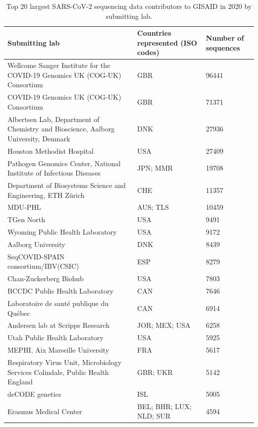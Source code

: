 \documentclass[9pt,twoside,lineno]{pnas-new}
\begin{document}
\begin{table}[h!]
\caption{Top 20 largest SARS-CoV-2 sequencing data contributors to GISAID in 2020 by submitting lab.}
\label{tab:seq-contributions}
\begin{tabular}{lll}
\hline
Submitting lab & Countries represented (ISO codes) & Number of sequences \\
\hline
Wellcome Sanger Institute for the COVID-19 Genomics UK (COG-UK) Consortium & GBR & 96441 \\ 
COVID-19 Genomics UK (COG-UK) Consortium & GBR & 71371 \\ 
Albertsen Lab, Department of Chemistry and Bioscience, Aalborg University, Denmark & DNK & 27936 \\ 
Houston Methodist Hospital & USA & 27409 \\ 
Pathogen Genomics Center, National Institute of Infectious Diseases & JPN; MMR & 19708 \\ 
Department of Biosystems Science and Engineering, ETH Zürich & CHE & 11357 \\ 
MDU-PHL & AUS; TLS & 10459 \\ 
TGen North & USA & 9491 \\ 
Wyoming Public Health Laboratory & USA & 9172 \\ 
Aalborg University & DNK & 8439 \\ 
SeqCOVID-SPAIN consortium/IBV(CSIC) & ESP & 8279 \\ 
Chan-Zuckerberg Biohub & USA & 7803 \\ 
BCCDC Public Health Laboratory & CAN & 7646 \\ 
Laboratoire de santé publique du Québec & CAN & 6914 \\ 
Andersen lab at Scripps Research & JOR; MEX; USA & 6258 \\ 
Utah Public Health Laboratory & USA & 5925 \\ 
MEPHI, Aix Marseille University & FRA & 5617 \\ 
Respiratory Virus Unit, Microbiology Services Colindale, Public Health England & GBR; UKR & 5142 \\ 
deCODE genetics & ISL & 5005 \\ 
Erasmus Medical Center & BEL; BHR; LUX; NLD; SUR & 4594 \\
\hline
\end{tabular}
\end{table}
\end{document}
